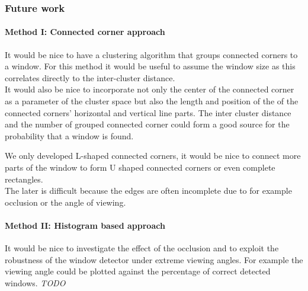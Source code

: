 \subsubsection{Future work}
\paragraph{Method I: Connected corner approach} 
It would be nice to have a clustering algorithm that groups connected corners to
a window. For this method it would be useful to assume the window size as this
correlates directly to the inter-cluster distance.\\

It would also be nice to incorporate not only the center of the connected corner
as a parameter of the cluster space but also the length and position of the of
the connected corners' horizontal and vertical line parts.  The inter cluster
distance and the number of grouped connected corner could form a good source for
the probability that a window is found.

We only developed L-shaped connected corners, it would be nice to connect more
parts of the window to form U shaped connected corners or even complete rectangles.\\
The later is difficult because the edges are often incomplete due to for example occlusion 
or the angle of viewing.


\paragraph{Method II: Histogram based approach} 
It would be nice to investigate the effect of the occlusion and to exploit the
robustness of the window detector under extreme viewing angles.
For example the viewing angle could be plotted against the percentage of
correct detected windows.
\emph{TODO}





% 
% 
% 
% 
% 
% 
% 
% 
